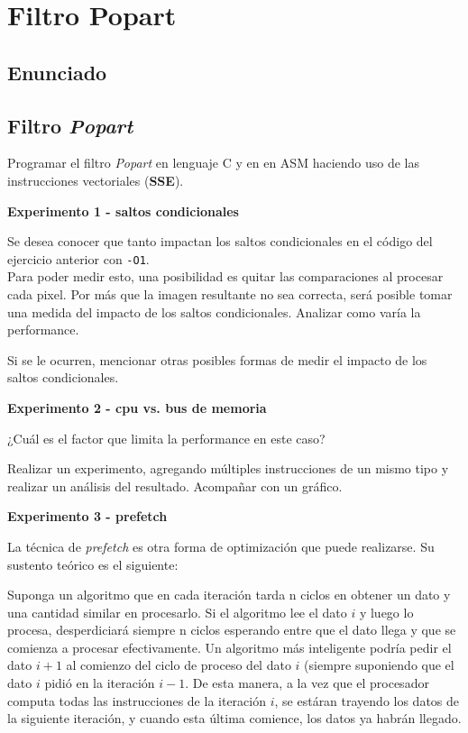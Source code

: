 \section{Filtro Popart}
\subsection{Enunciado}

\subsection*{Filtro \textit{Popart}}

  Programar el filtro \textit{Popart} en lenguaje C y en en ASM haciendo uso de 
  las instrucciones vectoriales (\textbf{SSE}).

\vspace*{0.3cm} \noindent
\textbf{Experimento 1 - saltos condicionales}

	Se desea conocer que tanto impactan los saltos condicionales
	en el código del ejercicio anterior con \verb|-O1|.\\
	Para poder medir esto, una posibilidad es quitar las comparaciones
	al procesar cada pixel. Por más que la imagen resultante no sea correcta,
	será posible tomar una medida del impacto de los saltos condicionales.
	Analizar como varía la performance. 
	
	Si se le ocurren, mencionar otras posibles formas de medir el impacto de los saltos condicionales.

\vspace*{0.3cm} \noindent
\textbf{Experimento 2 - cpu vs. bus de memoria}

	¿Cuál es el factor que limita la performance en este caso? 
	
	Realizar un experimento, agregando múltiples instrucciones de un mismo tipo
	y realizar un análisis 	del resultado. Acompañar con un gráfico.


\vspace*{0.3cm} \noindent
\textbf{Experimento 3 - prefetch}

  La técnica de \textit{prefetch} es otra forma de optimización que puede
  realizarse. Su sustento teórico es el siguiente:
  
  Suponga un algoritmo que en cada iteración tarda n ciclos en obtener un dato y una cantidad
  similar en procesarlo. Si el algoritmo lee el dato $i$ y luego lo procesa,
  desperdiciará siempre n ciclos esperando entre que el dato llega y que se comienza
  a procesar efectivamente. Un algoritmo más inteligente podría pedir el 
  dato $i+1$ al comienzo del ciclo de proceso del dato $i$ (siempre suponiendo
  que el dato $i$ pidió en la iteración $i-1$. De esta manera, a la vez que el
  procesador computa todas las instrucciones de la iteración $i$, se estáran trayendo
  los datos de la siguiente iteración, y cuando esta última comience, los datos ya
  habrán llegado.

